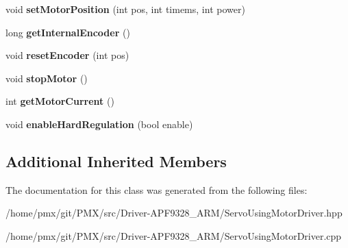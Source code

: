 \begin{DoxyCompactItemize}
\mbox{\label{classServoUsingMotorDriver_a9569643c48ac9d6c1936e8562825e280}} 
void {\bfseries set\+Motor\+Position} (int pos, int timems, int power)
\item 
\mbox{\label{classServoUsingMotorDriver_a64c62fd0ecb287fe45770c387e394eac}} 
long {\bfseries get\+Internal\+Encoder} ()
\item 
\mbox{\label{classServoUsingMotorDriver_acf78dbe83df0a7744fd40920a6388efd}} 
void {\bfseries reset\+Encoder} (int pos)
\item 
\mbox{\label{classServoUsingMotorDriver_a58fbf805d7bb382b505ea634e6bcbb08}} 
void {\bfseries stop\+Motor} ()
\item 
\mbox{\label{classServoUsingMotorDriver_ad76b35929d55c4249c5e7c3818c053b6}} 
int {\bfseries get\+Motor\+Current} ()
\item 
\mbox{\label{classServoUsingMotorDriver_adeb6e60d59bac919b7dc45c6f4a4f32c}} 
void {\bfseries enable\+Hard\+Regulation} (bool enable)
\end{DoxyCompactItemize}
\subsection*{Additional Inherited Members}


The documentation for this class was generated from the following files\+:\begin{DoxyCompactItemize}
\item 
/home/pmx/git/\+P\+M\+X/src/\+Driver-\/\+A\+P\+F9328\+\_\+\+A\+R\+M/Servo\+Using\+Motor\+Driver.\+hpp\item 
/home/pmx/git/\+P\+M\+X/src/\+Driver-\/\+A\+P\+F9328\+\_\+\+A\+R\+M/Servo\+Using\+Motor\+Driver.\+cpp\end{DoxyCompactItemize}
